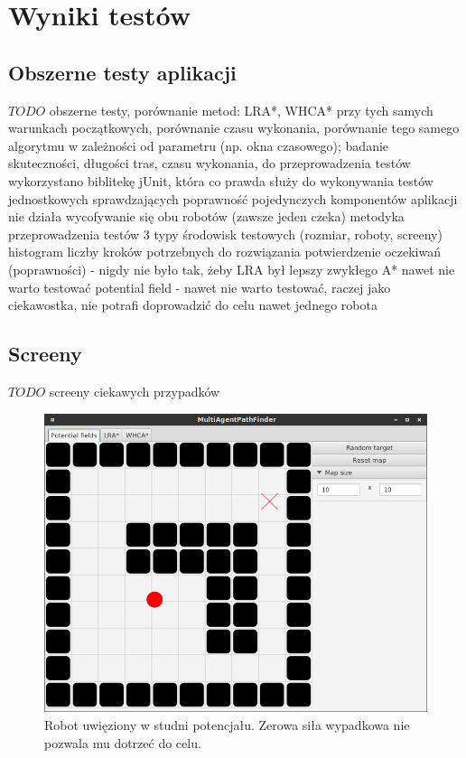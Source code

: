 \chapter{Wyniki testów}
\label{ch:tests}

\section{Obszerne testy aplikacji}
$TODO$ obszerne testy, porównanie metod: LRA*, WHCA* przy tych samych warunkach początkowych, porównanie czasu wykonania, porównanie tego samego algorytmu w zależności od parametru (np. okna czasowego); badanie skuteczności, długości tras, czasu wykonania, 
do przeprowadzenia testów wykorzystano biblitekę jUnit, która co prawda służy do wykonywania testów jednostkowych sprawdzających poprawność pojedynczych komponentów aplikacji
nie działa wycofywanie się obu robotów (zawsze jeden czeka)
metodyka przeprowadzenia testów
3 typy środowisk testowych (rozmiar, roboty, screeny)
histogram liczby kroków potrzebnych do rozwiązania
potwierdzenie oczekiwań (poprawności) - nigdy nie było tak, żeby LRA był lepszy
zwykłego A* nawet nie warto testować
potential field - nawet nie warto testować, raczej jako ciekawostka, nie potrafi doprowadzić do celu nawet jednego robota

\section{Screeny}
$TODO$ screeny ciekawych przypadków

\begin{figure}
	\centering
	\includegraphics[width=0.8\columnwidth]{img/robopath/field-potential-hole}
	\caption{Robot uwięziony w studni potencjału. Zerowa siła wypadkowa nie pozwala mu dotrzeć do celu.}
	\label{fig:app-tech-intellij}
\end{figure}

